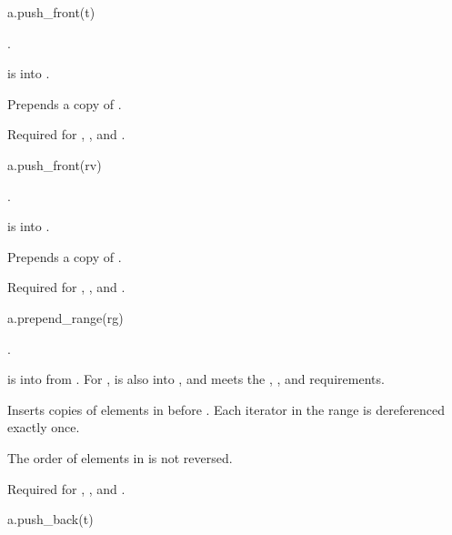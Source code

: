 \begin{itemdecl}
a.push_front(t)
\end{itemdecl}

\begin{itemdescr}
\pnum
\result
{}.

\pnum
\expects
{} is  into .

\pnum
\effects
Prepends a copy of .

\pnum
\remarks
Required for
,
, and
.
\end{itemdescr}

\begin{itemdecl}
a.push_front(rv)
\end{itemdecl}

\begin{itemdescr}
\pnum
\result
{}.

\pnum
\expects
{} is  into .

\pnum
\effects
Prepends a copy of .

\pnum
\remarks
Required for
,
, and
.
\end{itemdescr}

\begin{itemdecl}
a.prepend_range(rg)
\end{itemdecl}

\begin{itemdescr}
\pnum
\result
{}.

\pnum
\expects
{} is  into 
from .
For ,
 is also  into , and
 meets the
,
, and
 requirements.

\pnum
\effects
Inserts copies of elements in  before .
Each iterator in the range  is dereferenced exactly once.
\begin{note}
The order of elements in  is not reversed.
\end{note}

\pnum
\remarks
Required for
,
, and
.
\end{itemdescr}

\begin{itemdecl}
a.push_back(t)
\end{itemdecl}

